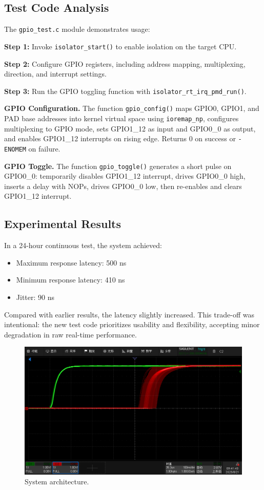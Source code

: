 \documentclass[letterpaper]{article}
\begin{document}
\subsection{Test Code Analysis}
The \texttt{gpio\_test.c} module demonstrates usage:
\begin{compactitem}
    \item \textbf{Step 1:} Invoke \texttt{isolator\_start()} to enable isolation on the target CPU.
    \item \textbf{Step 2:} Configure GPIO registers, including address mapping, multiplexing,
    direction, and interrupt settings.
    \item \textbf{Step 3:} Run the GPIO toggling function with \texttt{isolator\_rt\_irq\_pmd\_run()}.
\end{compactitem}

\textbf{GPIO Configuration.} The function \texttt{gpio\_config()} maps GPIO0, GPIO1, and PAD base
addresses into kernel virtual space using \texttt{ioremap\_np}, configures multiplexing to GPIO
mode, sets GPIO1\_12 as input and GPIO0\_0 as output, and enables GPIO1\_12 interrupts on rising
edge. Returns 0 on success or \texttt{-ENOMEM} on failure.

\textbf{GPIO Toggle.} The function \texttt{gpio\_toggle()} generates a short pulse on GPIO0\_0:
temporarily disables GPIO1\_12 interrupt, drives GPIO0\_0 high, inserts a delay with NOPs,
drives GPIO0\_0 low, then re-enables and clears GPIO1\_12 interrupt.

\subsection{Experimental Results}
In a 24-hour continuous test, the system achieved:
\begin{itemize}
    \item Maximum response latency: 500 ns
    \item Minimum response latency: 410 ns
    \item Jitter: 90 ns
\end{itemize}
Compared with earlier results, the latency slightly increased. This trade-off was intentional: the
new test code prioritizes usability and flexibility, accepting minor degradation in raw real-time
performance.

\begin{figure}
    \centering
    \includegraphics[width=0.85\columnwidth]{oscilloscope.png}
    \caption{System architecture.}
    \label{fig:oscilloscope}
\end{figure}
\end{document}
